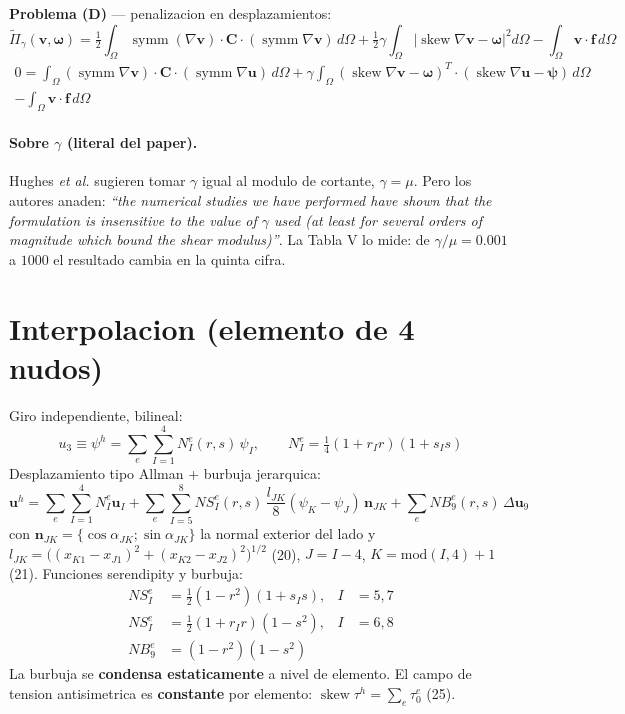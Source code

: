 \documentclass[11pt]{article}
\newcommand{\symm}{\operatorname{symm}}
\newcommand{\skewop}{\operatorname{skew}}
\begin{document}
\noindent\textbf{Problema (D)} --- penalizacion en desplazamientos:
\begin{equation}
\tilde\Pi_{\gamma}(\mathbf v,\boldsymbol\omega)=
\tfrac12\int_{\Omega}\symm(\nabla\mathbf v)\cdot\mathbf C\cdot(\symm\nabla\mathbf v)\,d\Omega
+\tfrac12\gamma\int_{\Omega}|\skewop\nabla\mathbf v-\boldsymbol\omega|^{2}d\Omega
-\int_{\Omega}\mathbf v\cdot\mathbf f\,d\Omega
\tag{14}
\end{equation}
\begin{multline}
0=\int_{\Omega}(\symm\nabla\mathbf v)\cdot\mathbf C\cdot(\symm\nabla\mathbf u)\,d\Omega
+\gamma\int_{\Omega}(\skewop\nabla\mathbf v-\boldsymbol\omega)^{T}\cdot(\skewop\nabla\mathbf u-\boldsymbol\psi)\,d\Omega\\
-\int_{\Omega}\mathbf v\cdot\mathbf f\,d\Omega
\tag{15}
\end{multline}

\paragraph{Sobre $\gamma$ (literal del paper).}
Hughes \emph{et al.} sugieren tomar $\gamma$ igual al modulo de cortante, $\gamma=\mu$.
Pero los autores anaden: \emph{``the numerical studies we have performed have shown that
the formulation is insensitive to the value of $\gamma$ used (at least for several orders
of magnitude which bound the shear modulus)''}. La Tabla V lo mide: de $\gamma/\mu=0.001$
a $1000$ el resultado cambia en la quinta cifra.

\section{Interpolacion (elemento de 4 nudos)}
Giro independiente, bilineal:
\begin{equation}
u_{3}\equiv\psi^{h}=\sum_{e}\sum_{I=1}^{4}N_{I}^{e}(r,s)\,\psi_{I},
\qquad N_{I}^{e}=\tfrac14(1+r_{I}r)(1+s_{I}s)
\tag{17,18}
\end{equation}
Desplazamiento tipo Allman + burbuja jerarquica:
\begin{equation}
\mathbf u^{h}=\sum_{e}\sum_{I=1}^{4}N_{I}^{e}\mathbf u_{I}
+\sum_{e}\sum_{I=5}^{8}NS_{I}^{e}(r,s)\,\frac{l_{JK}}{8}(\psi_{K}-\psi_{J})\,\mathbf n_{JK}
+\sum_{e}NB_{9}^{e}(r,s)\,\Delta\mathbf u_{9}
\tag{19}
\end{equation}
con $\mathbf n_{JK}=\{\cos\alpha_{JK};\sin\alpha_{JK}\}$ la normal exterior del lado y
$l_{JK}=\big((x_{K1}-x_{J1})^{2}+(x_{K2}-x_{J2})^{2}\big)^{1/2}$ (20),
$J=I-4$, $K=\mathrm{mod}(I,4)+1$ (21). Funciones serendipity y burbuja:
\begin{align}
NS_{I}^{e}&=\tfrac12(1-r^{2})(1+s_{I}s), & I&=5,7 \tag{22}\\
NS_{I}^{e}&=\tfrac12(1+r_{I}r)(1-s^{2}), & I&=6,8 \tag{23}\\
NB_{9}^{e}&=(1-r^{2})(1-s^{2}) &&\tag{24}
\end{align}
La burbuja se \textbf{condensa estaticamente} a nivel de elemento.
El campo de tension antisimetrica es \textbf{constante} por elemento:
$\skewop\tau^{h}=\sum_{e}\tau_{0}^{e}$ (25).
\end{document}
